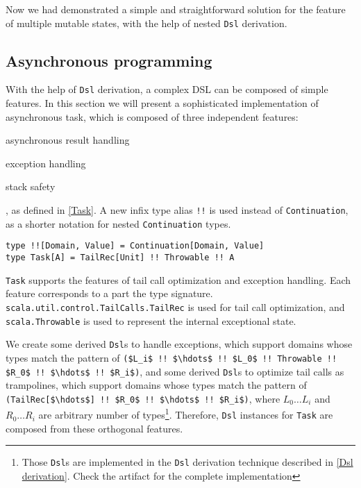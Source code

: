 Now we had demonstrated a simple and straightforward solution for the feature of multiple mutable states, with the help of nested \lstinline{Dsl} derivation.

\subsection{Asynchronous programming}\label{Asynchronous programming}

With the help of \lstinline{Dsl} derivation, a complex DSL can be composed of simple features. In this section we will present a sophisticated implementation of asynchronous task, which is composed of three independent features:
\begin{enumerate*}
  \item asynchronous result handling
  \item exception handling
  \item stack safety
\end{enumerate*}, as defined in \cref{Task}. A new infix type alias \lstinline{!!} is used instead of \lstinline{Continuation}, as a shorter notation for nested \lstinline{Continuation} types.

\begin{lstlisting}[caption={The definition of asynchronous \lstinline{Task}},label={Task}]
type !![Domain, Value] = Continuation[Domain, Value]
type Task[A] = TailRec[Unit] !! Throwable !! A
\end{lstlisting}

\lstinline{Task} supports the features of tail call optimization and exception handling. Each feature corresponds to a part the type signature. \lstinline{scala.util.control.TailCalls.TailRec} is used for tail call optimization, and \lstinline{scala.Throwable} is used to represent the internal exceptional state.

We create some derived \lstinline{Dsl}s to handle exceptions, which support domains whose types match the pattern of \lstinline[mathescape=true]{($L_i$ !! $\hdots$ !! $L_0$ !! Throwable !! $R_0$ !! $\hdots$ !! $R_i$)}, and some derived \lstinline{Dsl}s to optimize tail calls as trampolines, which support domains whose types match the pattern of \lstinline[mathescape=true]{(TailRec[$\hdots$] !! $R_0$ !! $\hdots$ !! $R_i$)}, where $L_0 \hdots L_i$ and $R_0 \hdots R_i$ are arbitrary number of types\footnote{Those \lstinline{Dsl}s are implemented in the \lstinline{Dsl} derivation technique described in \cref{Dsl derivation}. Check the artifact for the complete implementation}. Therefore, \lstinline{Dsl} instances for \lstinline{Task} are composed from these orthogonal features.

